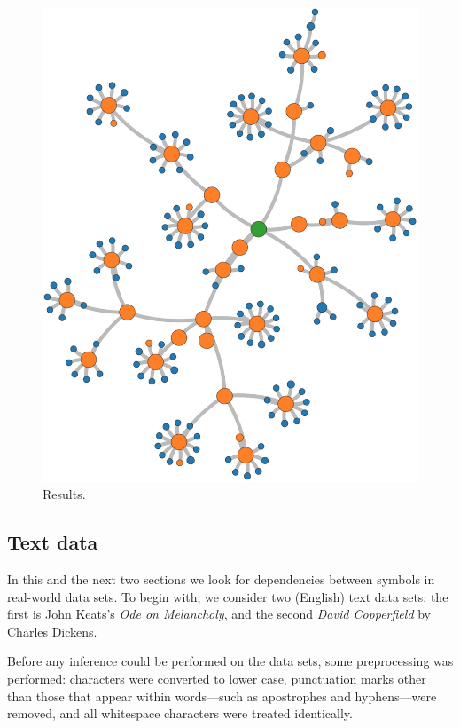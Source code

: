 \documentclass[12pt,a4paper]{article}
\begin{document}
\begin{figure}[htbp]
  \includegraphics[width=\textwidth]{figures/synthetic 3}
\caption{Results.}
\label{fig:25-character model 2}
\end{figure}

\subsection{Text data}\label{sec:text} %

In this and the next two sections we look for dependencies between symbols in
real-world data sets. To begin with, we consider two (English) text data sets:
the first is John Keats's \textit{Ode on Melancholy}, and the second
\textit{David Copperfield} by Charles Dickens.

Before any inference could be performed on the data sets, some preprocessing was
performed: characters were converted to lower case, punctuation marks other than
those that appear within words---such as apostrophes and hyphens---were removed,
and all whitespace characters were treated identically.
\end{document}
